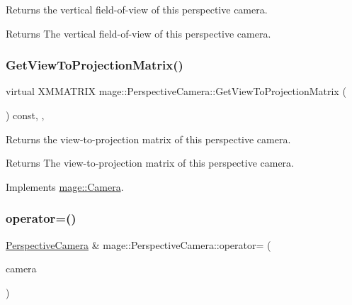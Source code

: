 Returns the vertical field-\/of-\/view of this perspective camera.

\begin{DoxyReturn}{Returns}
The vertical field-\/of-\/view of this perspective camera. 
\end{DoxyReturn}
\hypertarget{classmage_1_1_perspective_camera_af2c74a3038563c1c0cda3f1525a814a3}{}\label{classmage_1_1_perspective_camera_af2c74a3038563c1c0cda3f1525a814a3} 
\subsubsection{\texorpdfstring{Get\+View\+To\+Projection\+Matrix()}{GetViewToProjectionMatrix()}}
{\footnotesize\ttfamily virtual X\+M\+M\+A\+T\+R\+IX mage\+::\+Perspective\+Camera\+::\+Get\+View\+To\+Projection\+Matrix (\begin{DoxyParamCaption}{ }\end{DoxyParamCaption}) const\hspace{0.3cm}{\ttfamily [override]}, {\ttfamily [virtual]}, {\ttfamily [noexcept]}}

Returns the view-\/to-\/projection matrix of this perspective camera.

\begin{DoxyReturn}{Returns}
The view-\/to-\/projection matrix of this perspective camera. 
\end{DoxyReturn}


Implements \hyperlink{classmage_1_1_camera_ad72020c0bd6f8629bf8c8ba8bf583ed4}{mage\+::\+Camera}.

\hypertarget{classmage_1_1_perspective_camera_a0fe5ef8bd4d28efa8e4851a8055b6fa5}{}\label{classmage_1_1_perspective_camera_a0fe5ef8bd4d28efa8e4851a8055b6fa5} 
\subsubsection{\texorpdfstring{operator=()}{operator=()}\hspace{0.1cm}{\footnotesize\ttfamily [1/2]}}
{\footnotesize\ttfamily \hyperlink{classmage_1_1_perspective_camera}{Perspective\+Camera} \& mage\+::\+Perspective\+Camera\+::operator= (\begin{DoxyParamCaption}\item[{const \hyperlink{classmage_1_1_perspective_camera}{Perspective\+Camera} \&}]{camera }\end{DoxyParamCaption})\hspace{0.3cm}{\ttfamily [default]}}

